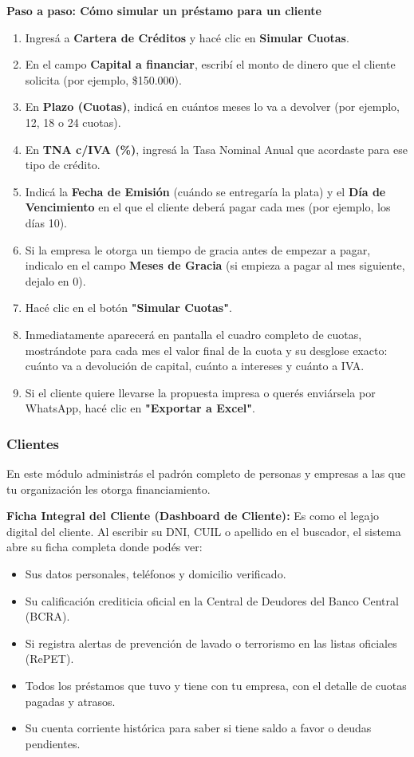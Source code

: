 \documentclass[12pt,a4paper]{article}
\renewcommand{\_}{\textunderscore\allowbreak}
\begin{document}
\textbf{Paso a paso: Cómo simular un préstamo para un cliente}
\begin{enumerate}
    \item Ingresá a \textbf{Cartera de Créditos} y hacé clic en \textbf{Simular Cuotas}.
    \item En el campo \textbf{Capital a financiar}, escribí el monto de dinero que el cliente solicita (por ejemplo, \$150.000).
    \item En \textbf{Plazo (Cuotas)}, indicá en cuántos meses lo va a devolver (por ejemplo, 12, 18 o 24 cuotas).
    \item En \textbf{TNA c/IVA (\%)}, ingresá la Tasa Nominal Anual que acordaste para ese tipo de crédito.
    \item Indicá la \textbf{Fecha de Emisión} (cuándo se entregaría la plata) y el \textbf{Día de Vencimiento} en el que el cliente deberá pagar cada mes (por ejemplo, los días 10).
    \item Si la empresa le otorga un tiempo de gracia antes de empezar a pagar, indicalo en el campo \textbf{Meses de Gracia} (si empieza a pagar al mes siguiente, dejalo en 0).
    \item Hacé clic en el botón \textbf{"Simular Cuotas"}.
    \item Inmediatamente aparecerá en pantalla el cuadro completo de cuotas, mostrándote para cada mes el valor final de la cuota y su desglose exacto: cuánto va a devolución de capital, cuánto a intereses y cuánto a IVA.
    \item Si el cliente quiere llevarse la propuesta impresa o querés enviársela por WhatsApp, hacé clic en \textbf{"Exportar a Excel"}.
\end{enumerate}

\subsubsection{Clientes}
En este módulo administrás el padrón completo de personas y empresas a las que tu organización les otorga financiamiento.

\textbf{Ficha Integral del Cliente (Dashboard de Cliente):}
Es como el legajo digital del cliente. Al escribir su DNI, CUIL o apellido en el buscador, el sistema abre su ficha completa donde podés ver:
\begin{itemize}
    \item Sus datos personales, teléfonos y domicilio verificado.
    \item Su calificación crediticia oficial en la Central de Deudores del Banco Central (BCRA).
    \item Si registra alertas de prevención de lavado o terrorismo en las listas oficiales (RePET).
    \item Todos los préstamos que tuvo y tiene con tu empresa, con el detalle de cuotas pagadas y atrasos.
    \item Su cuenta corriente histórica para saber si tiene saldo a favor o deudas pendientes.
\end{itemize}
\end{document}
